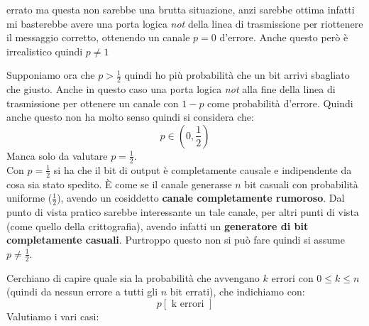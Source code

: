 \documentclass[a4paper,12pt, oneside]{book}
\begin{document}
\begin{definizione}
\begin{itemize}
    errato ma questa non sarebbe una brutta situazione, anzi sarebbe ottima
    infatti mi basterebbe avere una porta logica \textit{not} della linea di
    trasmissione per riottenere il messaggio corretto, ottenendo un canale $p=0$
    d'errore. Anche questo però è irrealistico quindi $p\neq 1$ 
  \end{itemize}
  Supponiamo ora che $p>\frac{1}{2}$ quindi ho più probabilità che un bit arrivi
  sbagliato che giusto. Anche in questo caso una porta logica \textit{not} alla
  fine della linea di trasmissione per ottenere un canale con $1-p$ come
  probabilità d'errore. Quindi anche questo non ha molto senso quindi si
  considera che:
  \[p\in\left(0,\frac{1}{2}\right )\]
  Manca solo da valutare $p=\frac{1}{2}$. \\
  Con $p=\frac{1}{2}$ si ha che il bit
  di output è completamente causale e indipendente da cosa sia stato spedito. È
  come se il canale generasse $n$ bit casuali con probabilità uniforme
  ($\frac{1}{2}$), avendo un cosiddetto \textbf{canale completamente
    rumoroso}. Dal punto di vista pratico sarebbe interessante un tale canale,
  per altri punti di vista (come quello della crittografia), avendo infatti un
  \textbf{generatore di bit completamente casuali}. Purtroppo questo non si può
  fare quindi si assume $p\neq \frac{1}{2}$.
\end{definizione}
Cerchiano di capire quale sia la probabilità che avvengano $k$ errori con $0\leq
k\leq n$ (quindi da nessun errore a tutti gli $n$ bit errati), che indichiamo
con: 
\[p[\mbox{ k errori }]\]
Valutiamo i vari casi:
\end{document}
